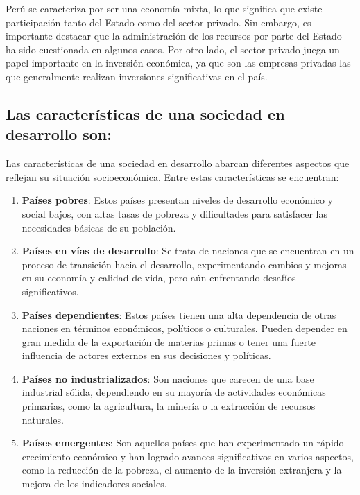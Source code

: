 \documentclass[
  letterpaper,
  DIV=11,
  numbers=noendperiod]{scrartcl}
\begin{document}
Perú se caracteriza por ser una economía mixta, lo que significa que
existe participación tanto del Estado como del sector privado. Sin
embargo, es importante destacar que la administración de los recursos
por parte del Estado ha sido cuestionada en algunos casos. Por otro
lado, el sector privado juega un papel importante en la inversión
económica, ya que son las empresas privadas las que generalmente
realizan inversiones significativas en el país.

\hypertarget{las-caracteruxedsticas-de-una-sociedad-en-desarrollo-son}{%
\subsection{Las características de una sociedad en desarrollo
son:}\label{las-caracteruxedsticas-de-una-sociedad-en-desarrollo-son}}

Las características de una sociedad en desarrollo abarcan diferentes
aspectos que reflejan su situación socioeconómica. Entre estas
características se encuentran:

\begin{enumerate}
\def\labelenumi{\arabic{enumi}.}
\item
  \textbf{Países pobres}: Estos países presentan niveles de desarrollo
  económico y social bajos, con altas tasas de pobreza y dificultades
  para satisfacer las necesidades básicas de su población.
\item
  \textbf{Países en vías de desarrollo}: Se trata de naciones que se
  encuentran en un proceso de transición hacia el desarrollo,
  experimentando cambios y mejoras en su economía y calidad de vida,
  pero aún enfrentando desafíos significativos.
\item
  \textbf{Países dependientes}: Estos países tienen una alta dependencia
  de otras naciones en términos económicos, políticos o culturales.
  Pueden depender en gran medida de la exportación de materias primas o
  tener una fuerte influencia de actores externos en sus decisiones y
  políticas.
\item
  \textbf{Países no industrializados}: Son naciones que carecen de una
  base industrial sólida, dependiendo en su mayoría de actividades
  económicas primarias, como la agricultura, la minería o la extracción
  de recursos naturales.
\item
  \textbf{Países emergentes}: Son aquellos países que han experimentado
  un rápido crecimiento económico y han logrado avances significativos
  en varios aspectos, como la reducción de la pobreza, el aumento de la
  inversión extranjera y la mejora de los indicadores sociales.
\end{enumerate}
\end{document}
